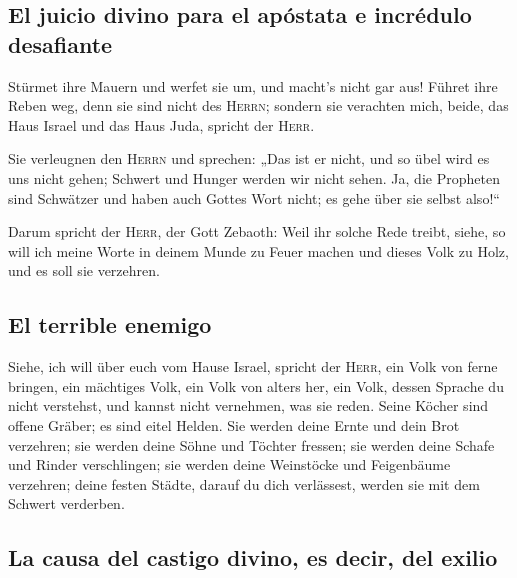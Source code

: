 \hypertarget{el-juicio-divino-para-el-apuxf3stata-e-incruxe9dulo-desafiante}{%
\subsection{El juicio divino para el apóstata e incrédulo
desafiante}\label{el-juicio-divino-para-el-apuxf3stata-e-incruxe9dulo-desafiante}}

 Stürmet ihre Mauern und werfet sie um, und macht's nicht
gar aus! Führet ihre Reben weg, denn sie sind nicht des \textsc{Herrn};
 sondern sie verachten mich, beide, das Haus Israel und
das Haus Juda, spricht der \textsc{Herr}.

 Sie verleugnen den \textsc{Herrn} und sprechen: „Das ist
er nicht, und so übel wird es uns nicht gehen; Schwert und Hunger werden
wir nicht sehen.  Ja, die Propheten sind Schwätzer und
haben auch Gottes Wort nicht; es gehe über sie selbst also!{}``

 Darum spricht der \textsc{Herr}, der Gott Zebaoth: Weil
ihr solche Rede treibt, siehe, so will ich meine Worte in deinem Munde
zu Feuer machen und dieses Volk zu Holz, und es soll sie verzehren.

\hypertarget{el-terrible-enemigo}{%
\subsection{El terrible enemigo}\label{el-terrible-enemigo}}

 Siehe, ich will über euch vom Hause Israel, spricht der
\textsc{Herr}, ein Volk von ferne bringen, ein mächtiges Volk, ein Volk
von alters her, ein Volk, dessen Sprache du nicht verstehst, und kannst
nicht vernehmen, was sie reden.  Seine Köcher sind offene
Gräber; es sind eitel Helden.  Sie werden deine Ernte und
dein Brot verzehren; sie werden deine Söhne und Töchter fressen; sie
werden deine Schafe und Rinder verschlingen; sie werden deine Weinstöcke
und Feigenbäume verzehren; deine festen Städte, darauf du dich
verlässest, werden sie mit dem Schwert verderben.

\hypertarget{la-causa-del-castigo-divino-es-decir-del-exilio}{%
\subsection{La causa del castigo divino, es decir, del
exilio}\label{la-causa-del-castigo-divino-es-decir-del-exilio}}

